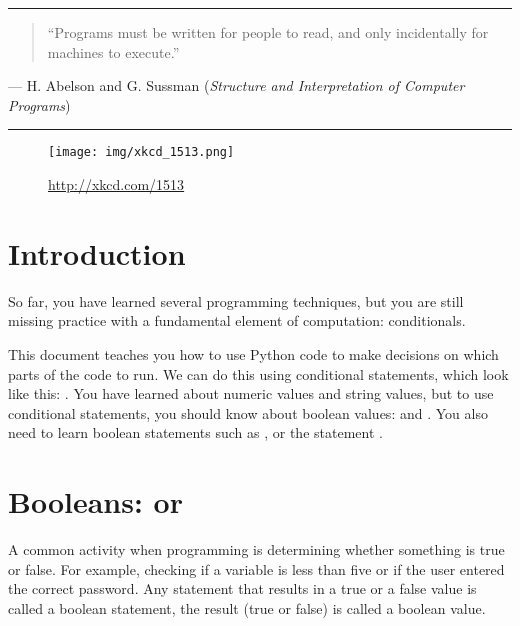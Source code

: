 \documentclass[11pt]{cselabheader}
\title{\thetitle}
\author{\theauthor}
\date{NMT Department of Computer Science and Engineering}
\begin{document}
\maketitle
\hrule

\begin{quotation}
    ``Programs must be written for people to read, and only incidentally for
    machines to execute.''
\end{quotation}
\begin{flushright}
--- H. Abelson and G. Sussman (\textit{Structure and Interpretation of Computer
Programs})
\end{flushright}

\hrule

\begin{figure}[H]
  \centering
  \texttt{[image: img/xkcd\_1513.png]}
  \caption{\url{http://xkcd.com/1513}}
\end{figure}

\newpage
\section*{Introduction}

So far, you have learned several programming techniques, but you are
still missing practice with a fundamental element of computation:
conditionals.

This document teaches you how to use Python code to make
decisions on which parts of the code to run. We can do this using
conditional statements, which look like this: .  You have learned about numeric values and string
values, but to use conditional statements, you should know about
boolean values:  and . You also
need to learn boolean statements such as , or the statement
.

\tableofcontents

\newpage
{}

\section{\texorpdfstring%
 {Booleans:  or }
 {Booleans: True or False}}

A common activity when programming is determining whether something is
true or false. For example, checking if a variable is less than five
or if the user entered the correct password. Any statement that
results in a true or a false value is called a boolean
statement, the result (true or false) is
called a boolean value.
\end{document}
